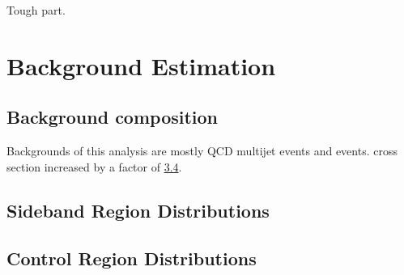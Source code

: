 \begin{savequote}[75mm]
Tough part.
\end{savequote}

\chapter{Background Estimation}

\section{Background composition}
Backgrounds of this analysis are mostly QCD multijet events and \ttbar events. \ttbar cross section increased by a factor of \href{https://cds.cern.ch/record/2227057/files/STDM-2016-02-02.pdf}{3.4}.


\section{Sideband Region Distributions}




\section{Control Region Distributions}






